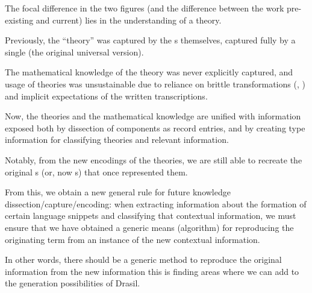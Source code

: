 The focal difference in the two figures (and the difference between the work
pre-existing and current) lies in the understanding of a theory.

Previously, the ``theory'' was captured by the \RelationConcept{}s themselves,
captured fully by a single \Expr{} (the original universal version).

The mathematical knowledge of the theory was never explicitly captured, and
usage of theories was unsustainable due to reliance on brittle transformations
(\relToQD{}, ) and implicit expectations of the
written transcriptions.

Now, the theories and the mathematical knowledge are unified with information
exposed both by dissection of components as record entries, and by creating type
information for classifying theories and relevant information.

Notably, from the new encodings of the theories, we are still able to recreate
the original \Expr{}s (or, now \ModelExpr{}s) that once represented them.

\theoriesSideBySideModelKinds{}


From this, we obtain a new general rule for future knowledge
dissection/capture/encoding: when extracting information about the formation of
certain language snippets and classifying that contextual information, we must
ensure that we have obtained a generic means (algorithm) for reproducing the
originating term from an instance of the new contextual information.

In other words, there should be a generic method to reproduce the original
information from the new information \textemdash{} this is finding areas where
we can add to the generation possibilities of Drasil.
